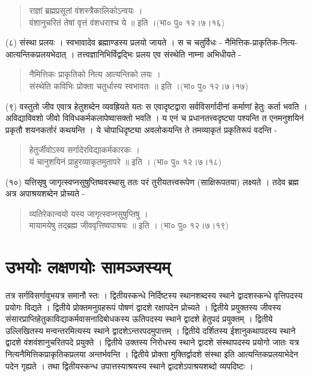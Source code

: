 \begin{verse}
राज्ञां ब्रह्मप्रसूतां वंशस्त्रैकालिकोऽन्वयः ।\\
वंशानुचरितं तेषां वृत्तं वंशधराश्च ये ॥ इति ।(भा० पु० १२।७।१६)
\end{verse}
(८) संस्था प्रलयः । स्वभावादेव ब्रह्माण्डस्य प्रलयो जायते । स च चतुर्विधः - नैमित्तिक-प्राकृतिक-नित्य-आत्यन्तिकप्रलयभेदात् । तत्त्वज्ञानिभिर्विद्वद्भिः प्रलय एव संस्थेति नाम्ना अभिधीयते -
\begin{verse}
नैमित्तिकः प्राकृतिको नित्य आत्यन्तिको लयः ।\\
संस्थेति कविभिः प्रोक्ता चतुर्धास्य स्वभावतः ॥ इति ।(भा० पु० १२।७।१७)
\end{verse}
(९) वस्तुतो जीव एवात्र हेतुशब्देन व्यवह्रियते यतः स एवादृष्टद्वारा सर्वविसर्गादीनां कर्माणां हेतुः कर्ता भवति । अविद्याविवशो जीवो विविधकर्मकलापेष्वासक्तो भवति । य एनं च प्रधानतत्त्वदृष्ट्या पश्यन्ति त एनमनुशयिनं प्रकृतौ शयनकर्तारं कथयन्ति । ये चोपाधिदृष्ट्या अवलोकयन्ति ते तमव्याकृतं प्रकृतिरूपं वदन्ति -
\begin{verse}
हेतुर्जीवोऽस्य सर्गादेरविद्याकर्मकारकः ।\\
यं चानुशयिनं प्राहुरव्याकृतमुतापरे ॥ इति । (भा० पु० १२।७।१८)
\end{verse}
(१०) यत्तिसृषु जागृत्स्वप्नसुषुप्तिष्ववस्थासु ततः परं तुरीयतत्त्वरूपेण (साक्षिरूपतया) लक्ष्यते । तदेव ब्रह्म अत्र अपाश्रयशब्देन प्रोच्यते -
\begin{verse}
व्यतिरेकान्वयो यस्य जागृत्स्वप्नसुषुप्तिषु ।\\
मायामयेषु तद्ब्रह्म जीववृत्तिष्वपाश्रयः ॥ इति । (भा० पु० १२।७।१९)
\end{verse}

\section*{उभयोः लक्षणयोः सामञ्जस्यम्}

तत्र सर्गविसर्गावुभयत्र समानौ स्तः । द्वितीयस्कन्धे निर्दिष्टस्य स्थानशब्दस्य स्थाने द्वादशस्कन्धे वृत्तिपदस्य प्रयोगः विद्यते । द्वितीये प्रोक्तमनुग्रहरूपं पोषणं द्वादशे रक्षापदेन प्रोच्यते । द्वितीये प्रयुक्तस्य जीवस्य संसारप्राप्तिहेतुकाविद्याकर्मवासनादिबोधकस्य ऊतिपदस्य स्थाने द्वादशे हेतुपदं प्रयुक्तम् । द्वितीये उल्लिखितस्य मन्वन्तरमित्यस्य स्थाने द्वादशेऽन्तरपदमुपात्तम् । द्वितीये दर्शितस्य ईशानुकथापदस्य स्थाने द्वादशे वंशवंशानुचरितपदे प्रयुक्ते । द्वितीये उक्तस्य निरोधस्य स्थाने द्वादशे संस्थापदस्य प्रयोगो जातः यत्र नित्यनैमित्तिकप्राकृतिकप्रलया अन्तर्भवन्ति । द्वितीये प्रोक्ता मुक्तिर्द्वादशे संस्था इति आत्यन्तिकप्रलयाभेदेन पदेन गृह्यते । तथा द्वितीयस्कन्ध उपात्तस्याश्रयस्य स्थाने द्वादशेऽपाश्रयशब्दो व्यपदिष्टः ।

